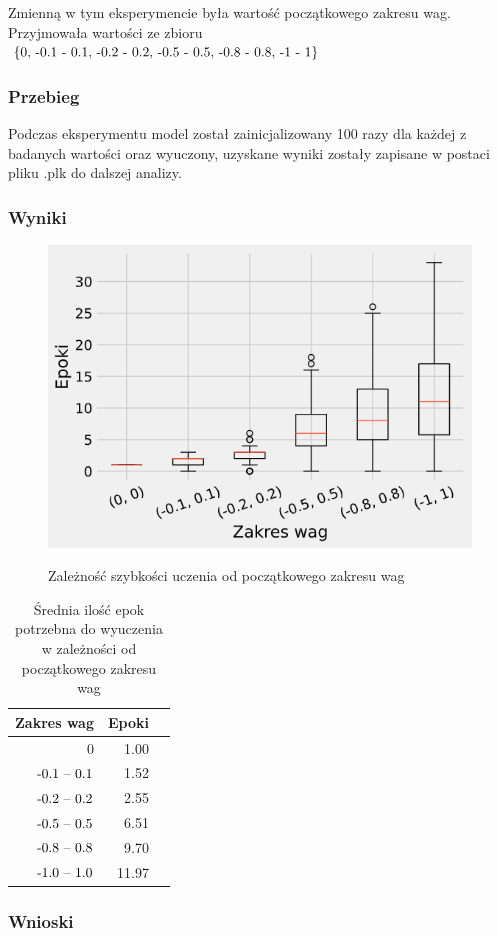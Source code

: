 \documentclass{article}
\begin{document}
Zmienną w tym eksperymencie była wartość początkowego zakresu wag. Przyjmowała wartości ze zbioru \(\{$0, -0.1 - 0.1, -0.2 - 0.2, -0.5 - 0.5, -0.8 - 0.8, -1 - 1$\}\)

\subsubsection*{Przebieg}

Podczas eksperymentu model został zainicjalizowany 100 razy dla każdej z badanych wartości oraz wyuczony, uzyskane wyniki zostały zapisane w postaci pliku .plk do dalszej analizy.
\subsubsection*{Wyniki}

\begin{figure}[!h]
	\centering
	\caption{Zależność szybkości uczenia od początkowego zakresu wag}
	\includegraphics[width=.5\textwidth]{ada_w.png}
	\label{fig:res5}
\end{figure}

\begin{table}[!h]
	\caption{Średnia ilość epok potrzebna do wyuczenia w zależności od początkowego zakresu wag}
	\label{tabela-res-5}
	\centering
	\begin{tabular}{rrr}
		\toprule
		Zakres wag        & Epoki \\
		\midrule
		0                 & 1.00  \\
		\($-0.1 -- 0.1$\) & 1.52  \\
		\($-0.2 -- 0.2$\) & 2.55  \\
		\($-0.5 -- 0.5$\) & 6.51  \\
		\($-0.8 -- 0.8$\) & 9.70  \\
		\($-1.0 -- 1.0$\) & 11.97 \\
		\bottomrule
	\end{tabular}
\end{table}

\subsubsection*{Wnioski}
\end{document}
